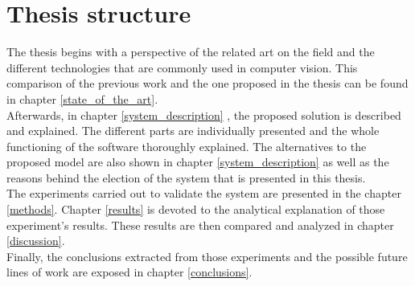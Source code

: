 \section{Thesis structure}

The thesis begins with a perspective of the related art on the field and the different technologies that are commonly used in computer vision. This comparison of the previous work and the one proposed in the thesis can be found in chapter \ref{state_of_the_art}. 
\\

Afterwards, in chapter \ref{system_description} , the proposed solution is described and explained. The different parts are individually presented and the whole functioning of the software thoroughly explained. The alternatives to the proposed model are also shown in chapter \ref{system_description} as well as the reasons behind the election of the system that is presented in this thesis. 
\\

The experiments carried out to validate the system are presented in the chapter \ref{methods}. Chapter \ref{results} is devoted to the analytical explanation of those experiment's results. 
These results are then compared and analyzed in chapter \ref{discussion}. 
\\

Finally, the conclusions extracted from those experiments and the possible future lines of work are exposed in chapter \ref{conclusions}. 
